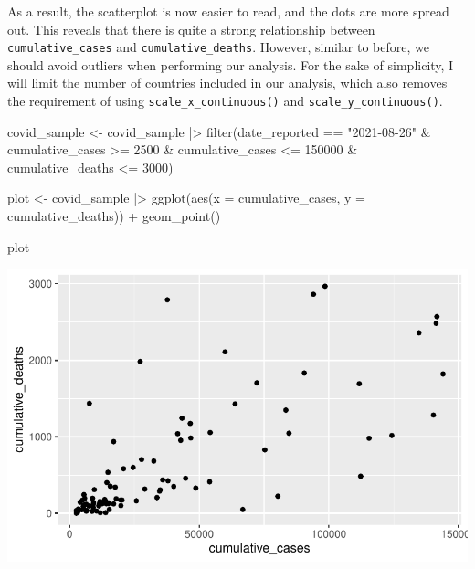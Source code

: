 \documentclass[
  letterpaper,
]{krantz}
\makeatletter
\newenvironment{Shaded}{\begin{snugshade}}{\end{snugshade}}
\newcommand{\AttributeTok}[1]{\textcolor[rgb]{0.40,0.45,0.13}{#1}}
\newcommand{\DecValTok}[1]{\textcolor[rgb]{0.68,0.00,0.00}{#1}}
\newcommand{\FunctionTok}[1]{\textcolor[rgb]{0.28,0.35,0.67}{#1}}
\newcommand{\NormalTok}[1]{\textcolor[rgb]{0.00,0.23,0.31}{#1}}
\newcommand{\OtherTok}[1]{\textcolor[rgb]{0.00,0.23,0.31}{#1}}
\newcommand{\SpecialCharTok}[1]{\textcolor[rgb]{0.37,0.37,0.37}{#1}}
\newcommand{\StringTok}[1]{\textcolor[rgb]{0.13,0.47,0.30}{#1}}
\newenvironment{kframe}{%
\medskip{}
\setlength{\fboxsep}{.8em}
 \def\at@end@of@kframe{}%
 \ifinner\ifhmode%
  \def\at@end@of@kframe{\end{minipage}}%
  \begin{minipage}{\columnwidth}%
 \fi\fi%
 \def\FrameCommand##1{\hskip\@totalleftmargin \hskip-\fboxsep
 \colorbox{shadecolor}{##1}\hskip-\fboxsep
     \hskip-\linewidth \hskip-\@totalleftmargin \hskip\columnwidth}%
 \MakeFramed {\advance\hsize-\width
   \@totalleftmargin\z@ \linewidth\hsize
   \@setminipage}}%
 {\par\unskip\endMakeFramed%
 \at@end@of@kframe}
\renewenvironment{Shaded}{\begin{kframe}}{\end{kframe}}
\makeatother
\begin{document}
As a result, the scatterplot is now easier to read, and the dots are
more spread out. This reveals that there is quite a strong relationship
between \texttt{cumulative\_cases} and \texttt{cumulative\_deaths}.
However, similar to before, we should avoid outliers when performing our
analysis. For the sake of simplicity, I will limit the number of
countries included in our analysis, which also removes the requirement
of using \texttt{scale\_x\_continuous()} and
\texttt{scale\_y\_continuous()}.

\begin{Shaded}
\begin{Highlighting}[]
\NormalTok{covid\_sample }\OtherTok{\textless{}{-}}
\NormalTok{  covid\_sample }\SpecialCharTok{|\textgreater{}}
  \FunctionTok{filter}\NormalTok{(date\_reported }\SpecialCharTok{==} \StringTok{"2021{-}08{-}26"} \SpecialCharTok{\&}
\NormalTok{           cumulative\_cases }\SpecialCharTok{\textgreater{}=} \DecValTok{2500} \SpecialCharTok{\&}
\NormalTok{           cumulative\_cases }\SpecialCharTok{\textless{}=} \DecValTok{150000} \SpecialCharTok{\&}
\NormalTok{           cumulative\_deaths }\SpecialCharTok{\textless{}=} \DecValTok{3000}\NormalTok{)}

\NormalTok{plot }\OtherTok{\textless{}{-}}\NormalTok{ covid\_sample }\SpecialCharTok{|\textgreater{}}
  \FunctionTok{ggplot}\NormalTok{(}\FunctionTok{aes}\NormalTok{(}\AttributeTok{x =}\NormalTok{ cumulative\_cases,}
             \AttributeTok{y =}\NormalTok{ cumulative\_deaths)) }\SpecialCharTok{+}
  \FunctionTok{geom\_point}\NormalTok{()}

\NormalTok{plot}
\end{Highlighting}
\end{Shaded}

\includegraphics{13_regressions_files/figure-pdf/fitting-model-by hand-step-three-1.pdf}
\end{document}
